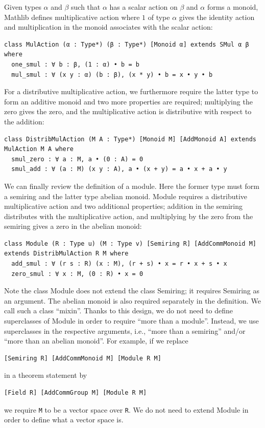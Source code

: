 \documentclass[]{article}
\renewcommand{\.}{\hskip .75pt}
\begin{document}
Given types $\alpha$ and $\beta$ such that $\alpha$ has a scalar action on $\beta$
and $\alpha$ forms a monoid, Mathlib defines multiplicative action where
$1$ of type $\alpha$ gives the identity action and multiplication in the monoid
associates with the scalar action:
\begin{lstlisting}
class MulAction (α : Type*) (β : Type*) [Monoid α] extends SMul α β where
  one_smul : ∀ b : β, (1 : α) • b = b
  mul_smul : ∀ (x y : α) (b : β), (x * y) • b = x • y • b
\end{lstlisting}
For a distributive multiplicative action, we furthermore require the latter type
to form an additive monoid and two more properties are required; multiplying the zero
gives the zero, and the multiplicative action is distributive with respect to the addition:
\begin{lstlisting}
class DistribMulAction (M A : Type*) [Monoid M] [AddMonoid A] extends MulAction M A where
  smul_zero : ∀ a : M, a • (0 : A) = 0
  smul_add : ∀ (a : M) (x y : A), a • (x + y) = a • x + a • y
\end{lstlisting}
We can finally review the definition of a module. Here the former type must form a semiring
and the latter type abelian monoid. Module requires a distributive multiplicative action and
two additional properties; addition in the semiring distributes with the multiplicative action,
and multiplying by the zero from the semiring gives a zero in the abelian monoid:
\begin{lstlisting}
class Module (R : Type u) (M : Type v) [Semiring R] [AddCommMonoid M] extends DistribMulAction R M where
  add_smul : ∀ (r s : R) (x : M), (r + s) • x = r • x + s • x
  zero_smul : ∀ x : M, (0 : R) • x = 0
\end{lstlisting}
Note the class Module does not extend the class Semiring; it requires Semiring as an argument.
The abelian monoid is also required separately in the definition. We call such a class ``mixin''.
Thanks to this design, we do not need to define superclasses of Module in order to require
``more than a module''. Instead, we use superclasses in the respective arguments, i.e.,
``more than a semiring'' and/or ``more than an abelian monoid''. For example, if we replace
\begin{lstlisting}
[Semiring R] [AddCommMonoid M] [Module R M]
\end{lstlisting}
in a theorem statement by
\begin{lstlisting}
[Field R] [AddCommGroup M] [Module R M]
\end{lstlisting}
we require \texttt{M} to be a vector space over \texttt{R}. We do not need to extend
Module in order to define what a vector space is.
\end{document}

